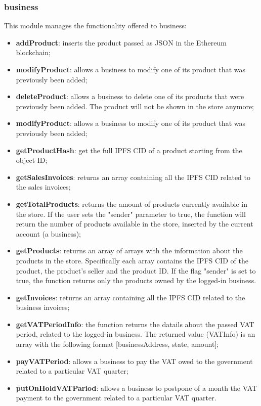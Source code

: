\subsubsection{business}
This module manages the functionality offered to business:
\begin{itemize}
	\item \textbf{addProduct}: inserts the product passed as JSON in the Ethereum blockchain; 
	\item \textbf{modifyProduct}: allows a business to modify one of its product that was previously been added;
	\item \textbf{deleteProduct}: allows a business to delete one of its products that were previously been added. The product will not be shown in the store anymore;
	\item \textbf{modifyProduct}: allows a business to modify one of its product that was previously been added;
	\item \textbf{getProductHash}: get the full IPFS CID of a product starting from the object ID;
	\item \textbf{getSalesInvoices}: returns an array containing all the IPFS CID related to the sales invoices;
	\item \textbf{getTotalProducts}: returns the amount of products currently available in the store. If the user sets the "sender" parameter to true, the function will return the number of products available in the store, inserted by the current account (a business);
	\item \textbf{getProducts}: returns an array of arrays with the information about the products in the store. Specifically each array contains the IPFS CID of the product, the product's seller and the product ID. If the flag "sender" is set to true, the function returns only the products owned by the logged-in business.
	\item \textbf{getInvoices}: returns an array containing all the IPFS CID related to the business invoices;
	\item \textbf{getVATPeriodInfo}: the function returns the datails about the passed VAT period, related to the logged-in business. The returned value (VATInfo) is an array with the following format [businessAddress, state, amount];
	\item \textbf{payVATPeriod}: allows a business to pay the VAT owed to the government related to a particular VAT quarter;
	\item \textbf{putOnHoldVATPariod}: allows a business to postpone of a month the VAT payment to the government related to a particular VAT quarter.

\end{itemize}
